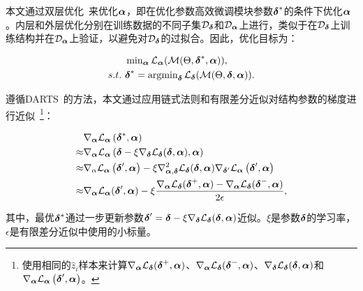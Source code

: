 本文通过双层优化~\cite{anandalingam1992hierarchical, liu2018darts}来优化$\boldsymbol{\alpha}$，即在优化参数高效微调模块参数$\boldsymbol{\delta}^*$的条件下优化$\boldsymbol{\alpha}$。内层和外层优化分别在训练数据的不同子集$\mathcal{D}_{\boldsymbol{\delta}}$和$\mathcal{D}_{\boldsymbol{\alpha}}$上进行，类似于在$\mathcal{D}_{\boldsymbol{\delta}}$上训练结构并在$\mathcal{D}_{\boldsymbol{\alpha}}$上验证，以避免对$\mathcal{D}_{\boldsymbol{\delta}}$的过拟合。因此，优化目标为：

{%
\begin{align}
    &\operatorname{min}_{\boldsymbol{\alpha}}\mathcal{L}_{\boldsymbol{\alpha}}(\mathcal{M}(\Theta, \boldsymbol{\delta}^*, \boldsymbol{\alpha})), \\
       s.t.\ & \boldsymbol{\delta}^* = \operatorname{argmin}_{\boldsymbol{\delta}} \mathcal{L}_{\boldsymbol{\delta}}( \mathcal{M}(\Theta,\boldsymbol{\delta}, \boldsymbol{\alpha})).
    \end{align}
    }
    
    遵循DARTS~\cite{liu2018darts}的方法，本文通过应用链式法则和有限差分近似对结构参数的梯度进行近似~\footnote{使用相同的$\hat{z}_i$样本来计算$\nabla_{\boldsymbol{\alpha}}\mathcal{L}_{\boldsymbol{\delta}}(\boldsymbol{\delta}^+,\boldsymbol{\alpha})$、$\nabla_{\boldsymbol{\alpha}}\mathcal{L}_{\boldsymbol{\delta}}(\boldsymbol{\delta}^-,\boldsymbol{\alpha})$、$\nabla_{\boldsymbol{\delta}}\mathcal{L}_{\boldsymbol{\delta}}(\boldsymbol{\delta},\boldsymbol{\alpha})$和$\nabla_{\boldsymbol{\alpha}} \mathcal{L}_{\boldsymbol{\alpha}}\left(\boldsymbol{\delta}^\prime, \boldsymbol{\alpha}\right)$。}：
    
    {%
    \begin{align}
    & \nabla_{\boldsymbol{\alpha}} \mathcal{L}_{\boldsymbol{\alpha}}\left(\boldsymbol{\delta}^*, \boldsymbol{\alpha}\right) \\
    \approx & \nabla_{\boldsymbol{\alpha}} \mathcal{L}_{\boldsymbol{\alpha}}\left(\boldsymbol{\delta} - \xi \nabla_{\boldsymbol{\delta}}\mathcal{L}_{\boldsymbol{\delta}}(\boldsymbol{\delta}, \boldsymbol{\alpha}), \boldsymbol{\alpha}\right) \\
    \approx & \nabla_{\alpha} \mathcal{L}_{\boldsymbol{\alpha}}\left(\boldsymbol{\delta}^{\prime}, \boldsymbol{\alpha}\right)-\xi \nabla_{\boldsymbol{\alpha}, \boldsymbol{\delta}}^{2} \mathcal{L}_{\boldsymbol{\delta}}(\boldsymbol{\delta}, \boldsymbol{\alpha}) \nabla_{\boldsymbol{\delta}^{\prime}} \mathcal{L}_{\boldsymbol{\alpha}}\left(\boldsymbol{\delta}^{\prime}, \boldsymbol{\alpha}\right)
    \label{equ:dartsapprox3}\\
    \approx & \nabla_{\boldsymbol{\alpha}} \mathcal{L}_{\boldsymbol{\alpha}}(\boldsymbol{\delta}^\prime, \boldsymbol{\alpha})- \xi\frac{\nabla_{\boldsymbol{\alpha}}\mathcal{L_{\boldsymbol{\delta}}(\boldsymbol{\delta}^+,\boldsymbol{\alpha}) - \nabla_{\boldsymbol{\alpha}}L_{\boldsymbol{\delta}}(\boldsymbol{\delta}^-,\boldsymbol{\alpha})}}{2\epsilon}, \label{equ:archigrad}
    \end{align}
    }
    
    其中，最优$\boldsymbol{\delta}^*$通过一步更新参数$\boldsymbol{\delta}^\prime = \boldsymbol{\delta} - \xi\nabla_{\boldsymbol{\delta}}\mathcal{L}_{\boldsymbol{\delta}}(\boldsymbol{\delta}, \boldsymbol{\alpha})$近似。$\xi$是参数$\boldsymbol{\delta}$的学习率，$\epsilon$是有限差分近似中使用的小标量。



